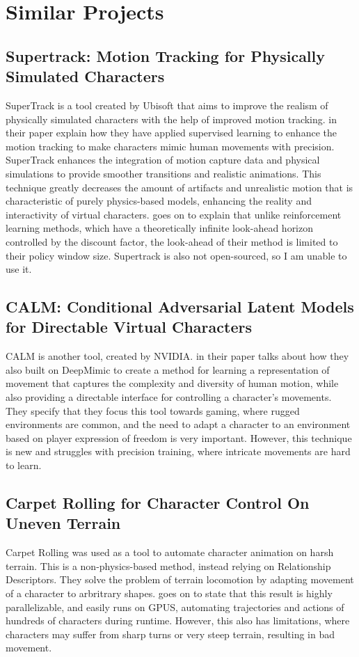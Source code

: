 \documentclass{l4proj}
\begin{document}
\section{Similar Projects}
\subsection{Supertrack: Motion Tracking for Physically Simulated Characters}
SuperTrack is a tool created by Ubisoft that aims to improve the realism of physically simulated characters with the help of improved motion tracking. \cite{Fussell2021} in their paper explain how they have applied supervised learning to enhance the motion tracking to make characters mimic human movements with precision. SuperTrack enhances the integration of motion capture data and physical simulations to provide smoother transitions and realistic animations. This technique greatly decreases the amount of artifacts and unrealistic motion that is characteristic of purely physics-based models, enhancing the reality and interactivity of virtual characters. \cite{Fussell2021} goes on to explain that unlike reinforcement learning methods, which have a theoretically infinite look-ahead horizon controlled by the discount factor, the look-ahead of their method is limited to their policy window size. Supertrack is also not open-sourced, so I am unable to use it.

\subsection{CALM: Conditional Adversarial Latent Models for Directable Virtual Characters}
CALM is another tool, created by NVIDIA. \cite{tessler2023calm} in their paper talks about how they also built on DeepMimic to create a method for learning a representation of movement that captures the complexity and diversity of human motion, while also providing a directable interface for controlling a character's movements. They specify that they focus this tool towards gaming, where rugged environments are common, and the need to adapt a character to an environment based on player expression of freedom is very important. However, this technique is new and struggles with precision training, where intricate movements are hard to learn.

\subsection{Carpet Rolling for Character Control On Uneven Terrain}
Carpet Rolling was used as a tool to automate character animation on harsh terrain. This is a non-physics-based method, instead relying on Relationship Descriptors. They solve the problem of terrain locomotion by adapting movement of a character to arbritrary shapes. \cite{Miller2015} goes on to state that this result is highly parallelizable, and easily runs on GPUS, automating trajectories and actions of hundreds of characters during runtime. However, this also has limitations, where characters may suffer from sharp turns or very steep terrain, resulting in bad movement.
\clearpage
\end{document}
